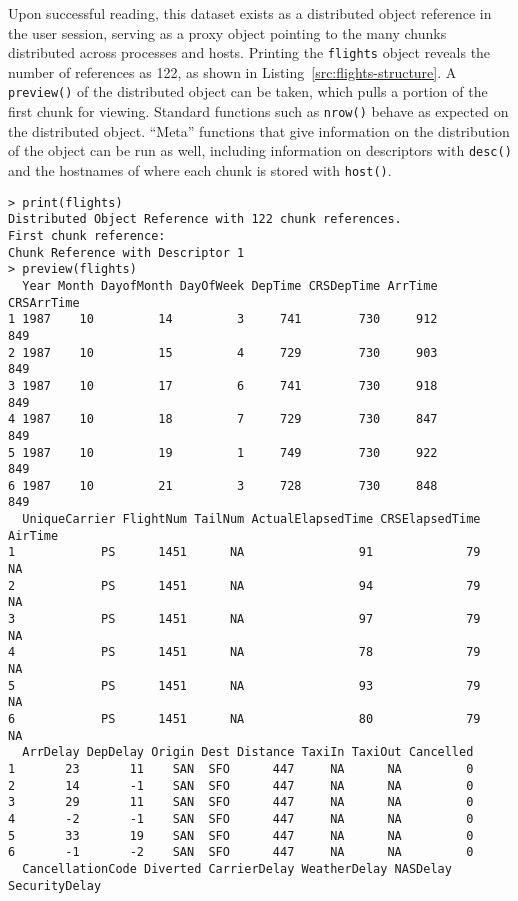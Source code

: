 Upon successful reading, this dataset exists as a distributed object reference in the user session, serving as a proxy object pointing to the many chunks distributed across processes and hosts.
Printing the \texttt{flights} object reveals the number of references as 122, as shown in Listing~\ref{src:flights-structure}.
A \texttt{preview()} of the distributed object can be taken, which pulls a portion of the first chunk for viewing.
Standard functions such as \texttt{nrow()} behave as expected on the distributed object.
``Meta'' functions that give information on the distribution of the object can be run as well, including information on descriptors with \texttt{desc()} and the hostnames of where each chunk is stored with \texttt{host()}.

\begin{listing}%
\begin{verbatim}
> print(flights)
Distributed Object Reference with 122 chunk references.
First chunk reference:
Chunk Reference with Descriptor 1
> preview(flights)
  Year Month DayofMonth DayOfWeek DepTime CRSDepTime ArrTime CRSArrTime
1 1987    10         14         3     741        730     912        849
2 1987    10         15         4     729        730     903        849
3 1987    10         17         6     741        730     918        849
4 1987    10         18         7     729        730     847        849
5 1987    10         19         1     749        730     922        849
6 1987    10         21         3     728        730     848        849
  UniqueCarrier FlightNum TailNum ActualElapsedTime CRSElapsedTime AirTime
1            PS      1451      NA                91             79      NA
2            PS      1451      NA                94             79      NA
3            PS      1451      NA                97             79      NA
4            PS      1451      NA                78             79      NA
5            PS      1451      NA                93             79      NA
6            PS      1451      NA                80             79      NA
  ArrDelay DepDelay Origin Dest Distance TaxiIn TaxiOut Cancelled
1       23       11    SAN  SFO      447     NA      NA         0
2       14       -1    SAN  SFO      447     NA      NA         0
3       29       11    SAN  SFO      447     NA      NA         0
4       -2       -1    SAN  SFO      447     NA      NA         0
5       33       19    SAN  SFO      447     NA      NA         0
6       -1       -2    SAN  SFO      447     NA      NA         0
  CancellationCode Diverted CarrierDelay WeatherDelay NASDelay SecurityDelay

\end{verbatim}
\end{listing}
